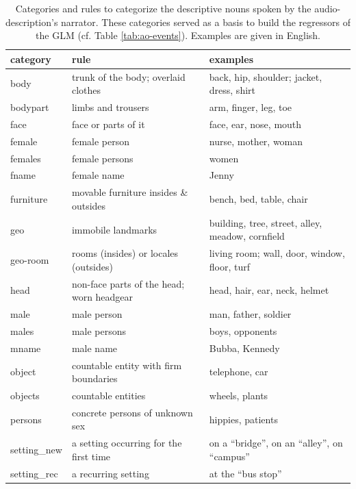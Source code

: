 \documentclass[english]{article}
\begin{document}
\begin{table}[h!]
    \caption{Categories and rules to categorize the descriptive nouns spoken by
        the audio-description's narrator. These categories served as a basis to
        build the regressors of the GLM (cf. Table \ref{tab:ao-events}).
        Examples are given in English.
}
\label{tab:descr-nouns-rules}
\begin{tabular}{lll}
\toprule
\textbf{category} & \textbf{rule} & \textbf{examples} \\
\midrule
body & trunk of the body; overlaid clothes & back, hip, shoulder; jacket, dress, shirt
\tabularnewline
bodypart & limbs and trousers & arm, finger, leg, toe
\tabularnewline
face & face or parts of it & face, ear, nose, mouth
\tabularnewline
female & female person & nurse, mother, woman
\tabularnewline
females & female persons & women
\tabularnewline
fname & female name & Jenny
\tabularnewline
furniture & movable furniture insides \& outsides & bench, bed, table, chair
\tabularnewline
geo & immobile landmarks & building, tree, street, alley, meadow, cornfield \tabularnewline
geo-room & rooms (insides) or  locales (outsides) & living room; wall, door,
window, floor, turf
\tabularnewline
head & non-face parts of the head; worn headgear & head, hair, ear, neck,
helmet
\tabularnewline
male & male person & man, father, soldier
\tabularnewline
males & male persons & boys, opponents
\tabularnewline
mname & male name & Bubba, Kennedy
\tabularnewline
object & countable entity with firm boundaries & telephone, car
\tabularnewline
objects & countable entities & wheels, plants
\tabularnewline
persons & concrete persons of unknown sex & hippies, patients
\tabularnewline
setting\_new & a setting occurring for the first time & on a ``bridge'', on an ``alley'', on ``campus''
\tabularnewline
setting\_rec & a recurring setting & at the ``bus stop'' \tabularnewline
\bottomrule
\end{tabular}
\end{table}


\end{document}
